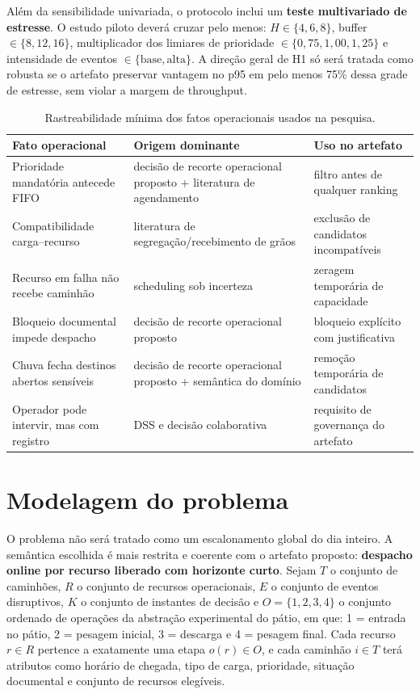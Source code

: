 \documentclass[
  12pt,
  oneside,
  a4paper,
  sumario=tradicional,
  brazil
]{abntex2}
\begin{document}
Al\'em da sensibilidade univariada, o protocolo inclui um \textbf{teste multivariado de estresse}. O estudo piloto dever\'a cruzar pelo menos: $H \in \{4,6,8\}$, buffer $\in \{8,12,16\}$, multiplicador dos limiares de prioridade $\in \{0{,}75,1{,}00,1{,}25\}$ e intensidade de eventos $\in \{\text{base},\text{alta}\}$. A dire\c{c}\~ao geral de H1 s\'o ser\'a tratada como robusta se o artefato preservar vantagem no p95 em pelo menos 75\% dessa grade de estresse, sem violar a margem de throughput.

\begin{table}[H]
\centering
\small
\begin{tabular}{|p{}|p{}|p{}|}
\hline
\textbf{Fato operacional} & \textbf{Origem dominante} & \textbf{Uso no artefato} \\
\hline
Prioridade mandat\'oria antecede FIFO & decis\~ao de recorte operacional proposto + literatura de agendamento & filtro antes de qualquer ranking \\
\hline
Compatibilidade carga--recurso & literatura de segrega\c{c}\~ao/recebimento de gr\~aos & exclus\~ao de candidatos incompat\'iveis \\
\hline
Recurso em falha n\~ao recebe caminh\~ao & scheduling sob incerteza & zeragem tempor\'aria de capacidade \\
\hline
Bloqueio documental impede despacho & decis\~ao de recorte operacional proposto & bloqueio expl\'icito com justificativa \\
\hline
Chuva fecha destinos abertos sens\'iveis & decis\~ao de recorte operacional proposto + sem\^antica do dom\'inio & remo\c{c}\~ao tempor\'aria de candidatos \\
\hline
Operador pode intervir, mas com registro & DSS e decis\~ao colaborativa & requisito de governan\c{c}a do artefato \\
\hline
\end{tabular}
\caption{Rastreabilidade m\'inima dos fatos operacionais usados na pesquisa.}
\end{table}

\chapter{Modelagem do problema}
O problema n\~ao ser\'a tratado como um escalonamento global do dia inteiro. A sem\^antica escolhida \'e mais restrita e coerente com o artefato proposto: \textbf{despacho online por recurso liberado com horizonte curto}. Sejam $T$ o conjunto de caminh\~oes, $R$ o conjunto de recursos operacionais, $E$ o conjunto de eventos disruptivos, $K$ o conjunto de instantes de decis\~ao e $O = \{1,2,3,4\}$ o conjunto ordenado de opera\c{c}\~oes da abstra\c{c}\~ao experimental do p\'atio, em que: 1 = entrada no p\'atio, 2 = pesagem inicial, 3 = descarga e 4 = pesagem final. Cada recurso $r \in R$ pertence a exatamente uma etapa $o(r) \in O$, e cada caminh\~ao $i \in T$ ter\'a atributos como hor\'ario de chegada, tipo de carga, prioridade, situa\c{c}\~ao documental e conjunto de recursos eleg\'iveis.
\end{document}
